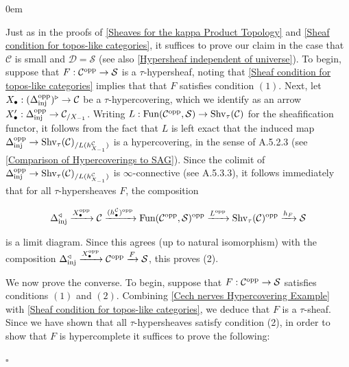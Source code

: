 \documentclass[10pt]{article}
\newcommand{\mS}{\mathcal S}
\newcommand{\C}{\mathcal C}
\newcommand{\cD}{\mathcal{D}}
\renewcommand{\qed}{\hfill$\square$}
\renewenvironment{proof}{\begin{addmargin}[1em]{0em}\begin{newproof}}{\end{newproof}\end{addmargin}\qed}
\theoremstyle{witharg}
\theoremstyle{witharg}
\theoremstyle{witharg2}
\begin{document}
\begin{proof}

Just as in the proofs of \ref{Sheaves for the kappa Product Topology} and \ref{Sheaf condition for topos-like categories}, it suffices to prove our claim in the case that $\C$ is small and $\cD=\mS$ (see also \ref{Hypersheaf independent of universe}). To begin, suppose that $F:\C^{\textnormal{opp}}\rightarrow \mS$ is a $\tau$-hypersheaf, noting that \ref{Sheaf condition for topos-like categories} implies that that $F$ satisfies condition $(1)$. Next, let $X_\bullet:(\Delta^{\textnormal{opp}}_{\textnormal{inj}})^\triangleright\rightarrow \C$ be a $\tau$-hypercovering, which we identify as an arrow $X_\bullet^\prime:\Delta^{\textnormal{opp}}_{\textnormal{inj}}\rightarrow \C_{/X_{-1}}$. Writing $L:\textnormal{Fun}(\C^{\textnormal{opp}},\mS)\rightarrow \textnormal{Shv}_\tau(\C)$ for the sheafification functor, it follows from the fact that $L$ is left exact that the induced map $\Delta^{\textnormal{opp}}_{\textnormal{inj}}\rightarrow \textnormal{Shv}_\tau(\C)_{/L(h^\C_{X_{-1}})}$ is a hypercovering, in the sense of  A.5.2.3 (see \ref{Comparison of Hypercoverings to SAG}). Since the colimit of $\Delta^{\textnormal{opp}}_{\textnormal{inj}}\rightarrow \textnormal{Shv}_\tau(\C)_{/L(h^\C_{X_{-1}})}$ is $\infty$-connective (see  A.5.3.3), it follows immediately that for all $\tau$-hypersheaves $F$, the composition 

   $$\Delta^\triangleleft_{\textnormal{inj}}\xrightarrow{X_\bullet^{\textnormal{opp}}}\C\xrightarrow{(h^\C_\bullet)^{\textnormal{opp}}}\textnormal{Fun}(\C^{\textnormal{opp}},\mS)^{\textnormal{opp}}\xrightarrow{L^{\textnormal{opp}}}\textnormal{Shv}_\tau(\C)^{\textnormal{opp}}\xrightarrow{h_F}\mS$$

   \noindent is a limit diagram. Since this agrees (up to natural isomorphism) with the composition $\Delta_{\textnormal{inj}}^\triangleleft\xrightarrow{X_\bullet^{\textnormal{opp}}}\C^{\textnormal{opp}}\xrightarrow{F}\mS$, this proves (2). 

   

   We now prove the converse. To begin, suppose that $F:\C^{\textnormal{opp}}\rightarrow \mS$ satisfies conditions $(1)$ and $(2)$. Combining \ref{Cech nerves Hypercovering Example} with \ref{Sheaf condition for topos-like categories}, we deduce that $F$ is a $\tau$-sheaf. Since we have shown that all $\tau$-hypersheaves satisfy condition (2), in order to show that $F$ is hypercomplete it suffices to prove the following: 


\end{proof}
\end{document}
